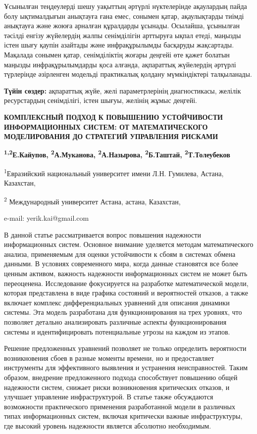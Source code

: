 Ұсынылған теңдеулерді шешу уақыттың әртүрлі нүктелерінде ақаулардың
пайда болу ықтималдығын анықтауға ғана емес, сонымен қатар, ақаулықтарды
тиімді анықтауға және жоюға арналған құралдарды ұсынады. Осылайша,
ұсынылған тәсілді енгізу жүйелердің жалпы сенімділігін арттыруға ықпал
етеді, маңызды істен шығу қаупін азайтады және инфрақұрылымды басқаруды
жақсартады. Мақалада сонымен қатар, сенімділіктің жоғары деңгейі өте
қажет болатын маңызды инфрақұрылымдарды қоса алғанда, ақпараттық
жүйелердің әртүрлі түрлерінде әзірленген модельді практикалық қолдану
мүмкіндіктері талқыланады.

\textbf{Түйін сөздер:} ақпараттық жүйе, желі параметрлерінің
диагностикасы, желілік ресурстардың сенімділігі, істен шығуы, желінің
жұмыс деңгейі.

\textbf{КОМПЛЕКСНЫЙ ПОДХОД К ПОВЫШЕНИЮ УСТОЙЧИВОСТИ ИНФОРМАЦИОННЫХ
СИСТЕМ: ОТ МАТЕМАТИЧЕСКОГО МОДЕЛИРОВАНИЯ ДО СТРАТЕГИЙ УПРАВЛЕНИЯ
РИСКАМИ}

\textbf{\textsuperscript{1,2}Е.Кайупов, \textsuperscript{2}А.Муканова,
\textsuperscript{2}А.Назырова, \textsuperscript{2}Б.Таштай,
\textsuperscript{2}Т.Толеубеков}

\textsuperscript{1}Евразийский национальный университет имени Л.Н.
Гумилева, Астана, Казахстан,

\textsuperscript{2} Международный университет Астана, астана, Казахстан,

e-mail: yerik.kai@gmail.com

В данной статье рассматривается вопрос повышения надежности
информационных систем. Основное внимание уделяется методам
математического анализа, применяемым для оценки устойчивости к сбоям в
системах обмена данными. В условиях современного мира, когда данные
становятся все более ценным активом, важность надежности информационных
систем не может быть переоценена. Исследование фокусируется на
разработке математической модели, которая представлена в виде графика
состояний и вероятностей отказов, а также включает комплекс
дифференциальных уравнений для описания динамики системы. Эта модель
разработана для функционирования на трех уровнях, что позволяет детально
анализировать различные аспекты функционирования системы и
идентифицировать потенциальные угрозы на каждом из этапов.

Решение предложенных уравнений позволяет не только определить
вероятности возникновения сбоев в разные моменты времени, но и
предоставляет инструменты для эффективного выявления и устранения
неисправностей. Таким образом, внедрение предложенного подхода
способствует повышению общей надежности систем, снижает риски
возникновения критических отказов, и улучшает управление
инфраструктурой. В статье также обсуждаются возможности практического
применения разработанной модели в различных типах информационных систем,
включая критически важные инфраструктуры, где высокий уровень надежности
является абсолютно необходимым.

